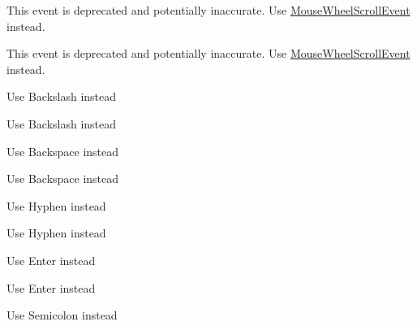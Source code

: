 
\begin{DoxyRefList}
\item[Class \mbox{\hyperlink{structsf_1_1_event_1_1_mouse_wheel_event}{sf\+::Event\+::Mouse\+Wheel\+Event}} ]\label{deprecated__deprecated000041}%
%
This event is deprecated and potentially inaccurate. Use \mbox{\hyperlink{structsf_1_1_event_1_1_mouse_wheel_scroll_event}{Mouse\+Wheel\+Scroll\+Event}} instead.

\label{deprecated__deprecated000018}%
%
This event is deprecated and potentially inaccurate. Use \mbox{\hyperlink{structsf_1_1_event_1_1_mouse_wheel_scroll_event}{Mouse\+Wheel\+Scroll\+Event}} instead. 
\item[Member \mbox{\hyperlink{classsf_1_1_keyboard_acb4cacd7cc5802dec45724cf3314a142a6766398940ad5791b5acfdc6238ecb74}{sf\+::Keyboard\+::Back\+Slash}} ]\label{deprecated__deprecated000044}%
%
Use Backslash instead 

\label{deprecated__deprecated000021}%
%
Use Backslash instead  
\item[Member \mbox{\hyperlink{classsf_1_1_keyboard_acb4cacd7cc5802dec45724cf3314a142ad47962f22c670150ee04798fda2030a7}{sf\+::Keyboard\+::Back\+Space}} ]\label{deprecated__deprecated000043}%
%
Use Backspace instead 

\label{deprecated__deprecated000020}%
%
Use Backspace instead  
\item[Member \mbox{\hyperlink{classsf_1_1_keyboard_acb4cacd7cc5802dec45724cf3314a142ab3d333d80ab5c00ffced0b666320bf0c}{sf\+::Keyboard\+::Dash}} ]\label{deprecated__deprecated000042}%
%
Use Hyphen instead 

\label{deprecated__deprecated000019}%
%
Use Hyphen instead  
\item[Member \mbox{\hyperlink{classsf_1_1_keyboard_acb4cacd7cc5802dec45724cf3314a142a45990e46db316fb01b760bce6b5fcf32}{sf\+::Keyboard\+::Return}} ]\label{deprecated__deprecated000046}%
%
Use Enter instead 

\label{deprecated__deprecated000023}%
%
Use Enter instead  
\item[Member \mbox{\hyperlink{classsf_1_1_keyboard_acb4cacd7cc5802dec45724cf3314a142a9b22353efcc6a3dd0e17b2892b22baef}{sf\+::Keyboard\+::Semi\+Colon}} ]\label{deprecated__deprecated000045}%
%
Use Semicolon instead 


\end{DoxyRefList}
